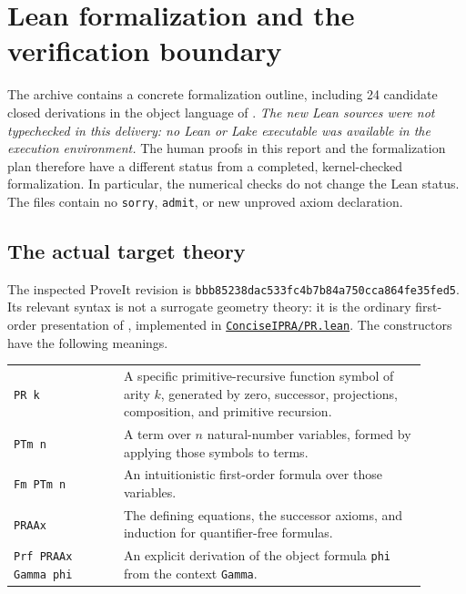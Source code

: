 \section{Lean formalization and the verification boundary}\label{sec:formalization}

The archive contains a concrete formalization outline, including 24 candidate
closed derivations in the object language of \ipra.  \emph{The new Lean sources
were not typechecked in this delivery: no Lean or Lake executable was available
in the execution environment.}  The human proofs in this report and the
formalization plan therefore have a different status from a completed,
kernel-checked formalization.  In particular, the numerical checks do not change
the Lean status.  The files contain no \texttt{sorry}, \texttt{admit}, or new
unproved axiom declaration.

\subsection{The actual target theory}

The inspected ProveIt revision is
\texttt{bbb85238dac533fc4b7b84a750cca864fe35fed5}.  Its relevant syntax is not a
surrogate geometry theory: it is the ordinary first-order presentation of
\ipra, implemented in
\href{https://github.com/VladimirReshetnikov/ProveIt/blob/bbb85238dac533fc4b7b84a750cca864fe35fed5/Logic/PrimitiveRecursiveArithmetic/ConciseIPRA/Lean/ConciseIPRA/PR.lean}{\texttt{ConciseIPRA/PR.lean}}.
The constructors have the following meanings.

\begin{center}
\begin{tabular}{p{0.24\linewidth}p{0.66\linewidth}}
\texttt{PR k} & A specific primitive-recursive function symbol of arity $k$,
generated by zero, successor, projections, composition, and primitive recursion.\\[3pt]
\texttt{PTm n} & A term over $n$ natural-number variables, formed by applying
those symbols to terms.\\[3pt]
\texttt{Fm PTm n} & An intuitionistic first-order formula over those variables.\\[3pt]
\texttt{PRAAx} & The defining equations, the successor axioms, and induction for
quantifier-free formulas.\\[3pt]
\texttt{Prf PRAAx Gamma phi} & An explicit derivation of the object formula
\texttt{phi} from the context \texttt{Gamma}.\\
\end{tabular}
\end{center}

